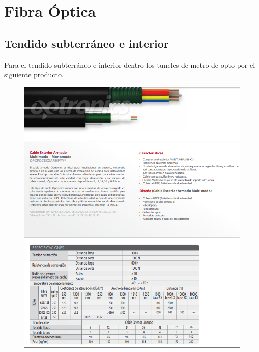 \documentclass[12pt,letterpaper]{article}
\begin{document}
\newpage
\section{Fibra Óptica}
\subsection{Tendido subterráneo e interior}
Para el tendido subterráneo e interior dentro los tuneles de metro de opto por el siguiente 
producto.
\begin{figure}[ht]
    \centering
    \includegraphics[width=.78\textwidth]{f17.png}
\end{figure}

\newpage
\end{document}
